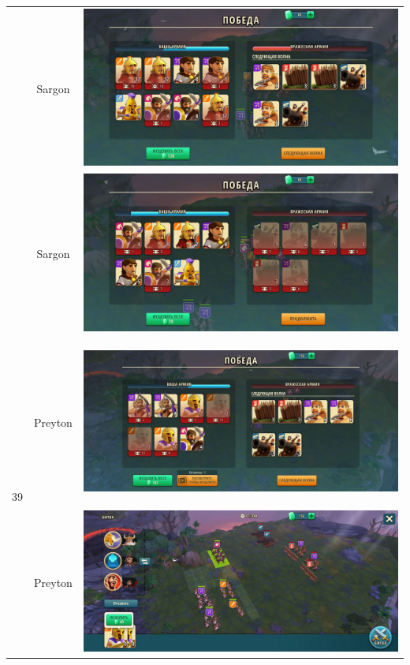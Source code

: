 \begin{longtable}{|c|c|c|}
	& Sargon &
	\includegraphics[width=0.75\linewidth]{./parts/media/TreasureHunt/39/sargon/photo_2022-04-07_13-18-21.jpg} \\
	& Sargon &
	\includegraphics[width=0.75\linewidth]{./parts/media/TreasureHunt/39/sargon/photo_2022-04-07_13-18-31.jpg} \\
	\hline
	\multirow{11}{*}{39} & Preyton &
	\hypertarget{fight39}{\includegraphics[width=0.75\linewidth]{./parts/media/TreasureHunt/39/Preyton/39_1.jpg}} \\
	& Preyton &
	\includegraphics[width=0.75\linewidth]{./parts/media/TreasureHunt/39/Preyton/39.2.jpg} \\

\end{longtable}
